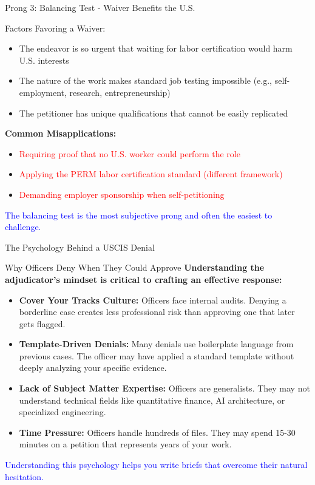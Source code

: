 \documentclass[11pt]{beamer}
\begin{document}
	\begin{frame}{Prong 3: Balancing Test - Waiver Benefits the U.S.}
		\scriptsize
		\begin{block}{Factors Favoring a Waiver:}
			\begin{itemize}
				\item The endeavor is so urgent that waiting for labor certification would harm U.S. interests
				\item The nature of the work makes standard job testing impossible (e.g., self-employment, research, entrepreneurship)
				\item The petitioner has unique qualifications that cannot be easily replicated
			\end{itemize}
			\textbf{Common Misapplications:}
			\begin{itemize}
				\item \textcolor{red}{Requiring proof that no U.S. worker could perform the role}
				\item \textcolor{red}{Applying the PERM labor certification standard (different framework)}
				\item \textcolor{red}{Demanding employer sponsorship when self-petitioning}
			\end{itemize}
			\textcolor{blue}{The balancing test is the most subjective prong and often the easiest to challenge.}
		\end{block}
	\end{frame}
	
	\begin{frame}{The Psychology Behind a USCIS Denial}
		\scriptsize
		\begin{block}{Why Officers Deny When They Could Approve}
			\textbf{Understanding the adjudicator's mindset is critical to crafting an effective response:}
			\vspace{0.1cm}
			\begin{itemize}
				\item \textbf{Cover Your Tracks Culture:} Officers face internal audits. Denying a borderline case creates less professional risk than approving one that later gets flagged.
				\item \textbf{Template-Driven Denials:} Many denials use boilerplate language from previous cases. The officer may have applied a standard template without deeply analyzing your specific evidence.
				\item \textbf{Lack of Subject Matter Expertise:} Officers are generalists. They may not understand technical fields like quantitative finance, AI architecture, or specialized engineering.
				\item \textbf{Time Pressure:} Officers handle hundreds of files. They may spend 15-30 minutes on a petition that represents years of your work.
			\end{itemize}
			\textcolor{blue}{Understanding this psychology helps you write briefs that overcome their natural hesitation.}
		\end{block}
	\end{frame}
	
\end{document}
